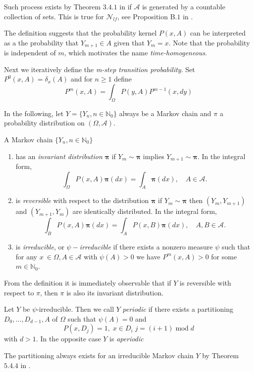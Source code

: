 Such process exists by Theorem $3.4.1$ in \cite{MeynTweedie1993} if $\mathcal A$ is generated by a countable collection of sets. This is true for $\mathcal N_{lf}$, see Proposition B$.1$ in \cite{MollerWaagepetersen2003}. \newline

The definition suggests that the probability kernel $P(x,A)$ can be interpreted as a the probability that $Y_{m+1} \in A$ given that $Y_{m}=x$. Note that the probability is independent of $m$, which motivates the name \textit{time-homogeneous}.

Next we iteratively define the \textit{m-step transition probability}. Set $P^0(x,A) = \delta_x(A)$ and for $n\geq 1$ define
$$P^m(x,A) = \int_\Omega P(y,A) P^{m-1} (x,dy)$$


In the following, let $Y=\{Y_n, n\in \mathbb N_0\}$ always be a Markov chain and $\pi$ a probability distribution on $(\Omega,\mathcal A)$.

\begin{definition}
A Markov chain $\{Y_n, n \in \mathbb N_0\}$ 
\begin{enumerate}
\item has an \textit{invariant distribution} $\mathbf \pi$ if $Y_m \sim \mathbf\pi$ implies $Y_{m+1}\sim \mathbf\pi$. In the integral form,
$$\int_\Omega P(x,A) \mathbf\pi(dx) = \int_A \mathbf\pi(dx), \quad A \in \mathcal A.$$
\item is \textit{reversible} with respect to the distribution $\mathbf \pi$ if $Y_m \sim \mathbf\pi$ then $(Y_m,Y_{m+1})$ and $(Y_{m+1},Y_m)$ are identically distributed. In the integral form,
$$\int_B P(x,A) \mathbf\pi(dx) = \int_A P(x,B) \mathbf\pi(dx), \quad A,B\in\mathcal A .$$
\item is \textit{irreducible}, or $\psi-$\textit{irreducible} if there exists a nonzero measure $\psi$ such that for any $x~\in \Omega, A\in\mathcal A$ with $\psi(A)>0$ we have $P^m(x,A)>0$ for some $m\in\mathbb N_0$.
\end{enumerate}
\end{definition}
From the definition it is immediately observable that if $Y$ is reversible with respect to $\pi$, then $\pi$ is also its invariant distribution.


\begin{definition} Let $Y$ be $\psi$-irreducible. Then we call $Y$ \textit{periodic} if there exists a partitioning $D_0,\dots,D_{d-1},A$ of $\Omega$ such that $\psi(A)=0$ and 
$$P(x,D_{j}) = 1, \; x\in D_i\; j=(i+1)\; \mathrm{mod} \;d$$
with $d>1$. In the opposite case $Y$ is \textit{aperiodic}
\end{definition}
The partitioning always exists for an irreducible Markov chain $Y$ by Theorem $5.4.4$ in \cite{MeynTweedie1993}.




